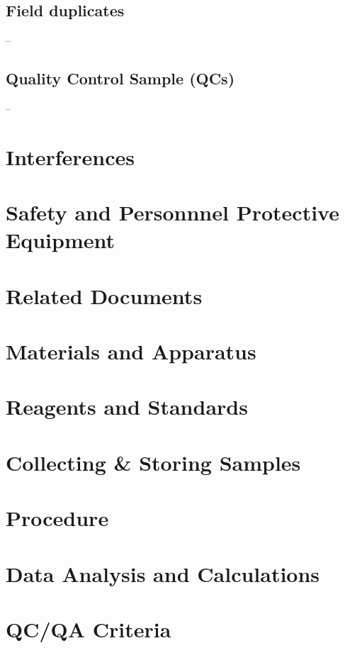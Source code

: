 \documentclass{article}
\begin{document}
\subsection{\textbf{Field duplicates}} --
\subsection{\textbf{Quality Control Sample (QCs)}} --
\section{Interferences}
\section{Safety and Personnnel Protective Equipment}
\section{Related Documents}
\section{Materials and Apparatus}
\section{Reagents and Standards}
\section{Collecting \& Storing Samples}
\section{Procedure}
\section{Data Analysis and Calculations}
\section{QC/QA Criteria}
\end{document}
